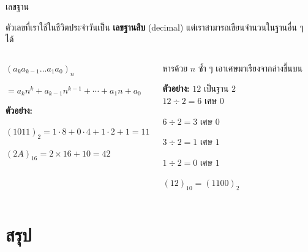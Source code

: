\documentclass[11pt, aspectratio=169]{beamer}
\begin{document}
\begin{frame}{เลขฐาน}
  \begin{explanation}[แนวคิด]
    ตัวเลขที่เราใช้ในชีวิตประจำวันเป็น \textbf{เลขฐานสิบ} (decimal)
    แต่เราสามารถเขียนจำนวนในฐานอื่น ๆ ได้
  \end{explanation}

  \begin{columns}[T]
      \begin{exambox}
        $(a_k a_{k-1} \ldots a_1 a_0)_n$

        $= a_k n^k + a_{k-1} n^{k-1} + \cdots + a_1 n + a_0$

        \textbf{ตัวอย่าง:}

        $(1011)_2 = 1\cdot8 + 0\cdot4 + 1\cdot2 + 1 = 11$

        $(2A)_{16} = 2 \times 16 + 10 = 42$
      \end{exambox}
      \begin{exambox}
        หารด้วย $n$ ซํ้า ๆ เอาเศษมาเรียงจากล่างขึ้นบน

        \textbf{ตัวอย่าง:} $12$ เป็นฐาน $2$ \\
        $12 \div 2 = 6$ เศษ $0$

        $6 \div 2 = 3$ เศษ $0$

        $3 \div 2 = 1$ เศษ $1$

        $1 \div 2 = 0$ เศษ $1$

        $(12)_{10} = (1100)_2$
      \end{exambox}
  \end{columns}
\end{frame}

\section{สรุป}
\end{document}
